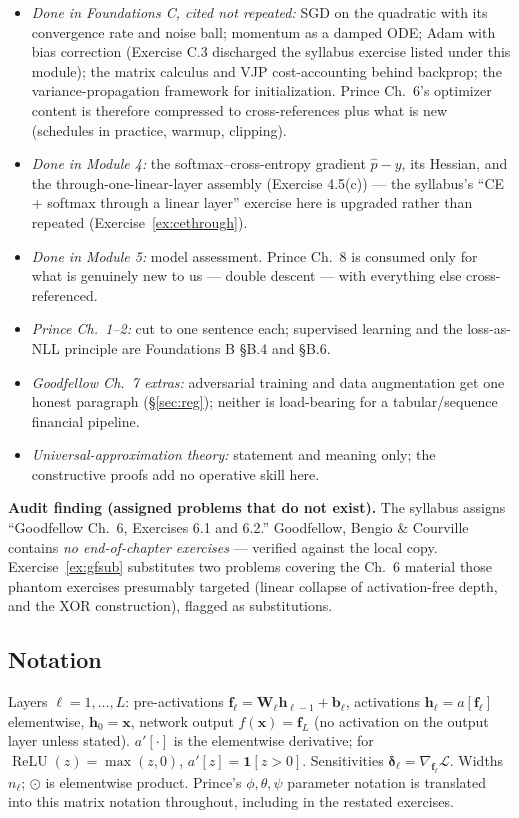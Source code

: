 \documentclass[11pt]{article}
\numberwithin{equation}{section}
\theoremstyle{plain}
\theoremstyle{definition}
\theoremstyle{remark}
\newcounter{exercise}
\DeclareMathOperator{\ReLU}{ReLU}
\newcommand{\x}{\bm{x}}
\newcommand{\bh}{\bm{h}}
\newcommand{\bW}{\bm{W}}
\newcommand{\bb}{\bm{b}}
\newcommand{\bdelta}{\bm{\delta}}
\begin{document}
\begin{itemize}[leftmargin=2em,itemsep=0.15em]
\item \emph{Done in Foundations C, cited not repeated:} SGD on the quadratic with its convergence rate and noise ball; momentum as a damped ODE; Adam with bias correction (Exercise C.3 discharged the syllabus exercise listed under this module); the matrix calculus and VJP cost-accounting behind backprop; the variance-propagation framework for initialization. Prince Ch.\ 6's optimizer content is therefore compressed to cross-references plus what is new (schedules in practice, warmup, clipping).
\item \emph{Done in Module 4:} the softmax--cross-entropy gradient $\hat p - y$, its Hessian, and the through-one-linear-layer assembly (Exercise 4.5(c)) --- the syllabus's ``CE + softmax through a linear layer'' exercise here is upgraded rather than repeated (Exercise~\ref{ex:cethrough}).
\item \emph{Done in Module 5:} model assessment. Prince Ch.\ 8 is consumed only for what is genuinely new to us --- double descent --- with everything else cross-referenced.
\item \emph{Prince Ch.\ 1--2:} cut to one sentence each; supervised learning and the loss-as-NLL principle are Foundations B \S B.4 and \S B.6.
\item \emph{Goodfellow Ch.\ 7 extras:} adversarial training and data augmentation get one honest paragraph (\S\ref{sec:reg}); neither is load-bearing for a tabular/sequence financial pipeline.
\item \emph{Universal-approximation theory:} statement and meaning only; the constructive proofs add no operative skill here.
\end{itemize}

\textbf{Audit finding (assigned problems that do not exist).} The syllabus assigns ``Goodfellow Ch.\ 6, Exercises 6.1 and 6.2.'' Goodfellow, Bengio \& Courville contains \emph{no end-of-chapter exercises} --- verified against the local copy. Exercise~\ref{ex:gfsub} substitutes two problems covering the Ch.\ 6 material those phantom exercises presumably targeted (linear collapse of activation-free depth, and the XOR construction), flagged as substitutions.

\subsection*{Notation}

Layers $\ell = 1, \dots, L$: pre-activations $\bm f_\ell = \bW_\ell \bh_{\ell-1} + \bb_\ell$, activations $\bh_\ell = a[\bm f_\ell]$ elementwise, $\bh_0 = \x$, network output $f(\x) = \bm f_L$ (no activation on the output layer unless stated). $a'[\cdot]$ is the elementwise derivative; for $\ReLU(z) = \max(z, 0)$, $a'[z] = \mathbf{1}[z > 0]$. Sensitivities $\bdelta_\ell = \nabla_{\bm f_\ell} \mathcal{L}$. Widths $n_\ell$; $\odot$ is elementwise product. Prince's $\phi, \theta, \psi$ parameter notation is translated into this matrix notation throughout, including in the restated exercises.
\end{document}
